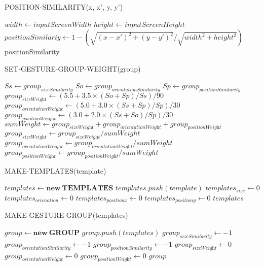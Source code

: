 \begin{algorithm}
  \caption*{POSITION-SIMILARITY(x, x', y, y')}
  \begin{algorithmic}[1]
      \State$width\gets inputScreenWidth$
    \State$height\gets inputScreenHeight$
  \State $positionSimilariy\gets 1 - (\sqrt{(x - x')^2 + (y - y')^2} / \sqrt{width^2 + height^2})$
   \Return positionSimilarity
\end{algorithmic}
\end{algorithm}

\begin{algorithm}
  \caption*{SET-GESTURE-GROUP-WEIGHT(group)}
  \begin{algorithmic}[1]
  \State $Ss\gets group_\textit{sizeSimilarity}$
   \State $So\gets group_\textit{orientationSimilarity}$
    \State $Sp\gets group_\textit{positionSimilarity}$
  \State $group_\textit{sizeWeight}\gets (5.5 + 3.5\times (So + Sp) / Ss) / 90$
  \State $group_\textit{orientationWeight}\gets (5.0 + 3.0\times (Ss + Sp) / Sp) / 30$
  \State $group_\textit{positionWeight}\gets (3.0 + 2.0\times (Ss + So) / Sp) / 30$
  \State $sumWeight\gets group_\textit{sizeWeight} + group_\textit{orientationWeight} + group_\textit{positionWeight}$
  \State $group_\textit{sizeWeight}\gets group_\textit{sizeWeight} / sumWeight$
  \State $group_\textit{orientationWeight}\gets group_\textit{orientationWeight} / sumWeight$
  \State $group_\textit{positionWeight}\gets group_\textit{positionWeight} / sumWeight$
\end{algorithmic}
\end{algorithm}

\begin{algorithm}
  \caption*{MAKE-TEMPLATES(template)}
  \begin{algorithmic}[1]
  \State $templates\gets \textbf{new}\: \textbf{TEMPLATES}$
  \State $templates.push(template)$
  \State $templates_\textit{size}\gets 0$
  \State $templates_\textit{orienation}\gets 0$
  \State $templates_\textit{positionx}\gets 0$
   \State $templates_\textit{positiony}\gets 0$
  \Return $templates$
\end{algorithmic}
\end{algorithm}

\begin{algorithm}
  \caption*{MAKE-GESTURE-GROUP(templates)}
  \begin{algorithmic}[1]
   \State $group\gets \textbf{new}\: \textbf{GROUP}$
  \State $group.push(templates)$
  \State $group_\textit{sizeSimilarity}\gets -1$
  \State $group_\textit{orientationSimilarity}\gets -1$
  \State $group_\textit{positionSimilarity}\gets -1$
  \State $group_\textit{sizeWeight}\gets 0$
  \State $group_\textit{orientationWeight}\gets 0$
  \State $group_\textit{positionWeight}\gets 0$
  \Return $group$
\end{algorithmic}
\end{algorithm}

